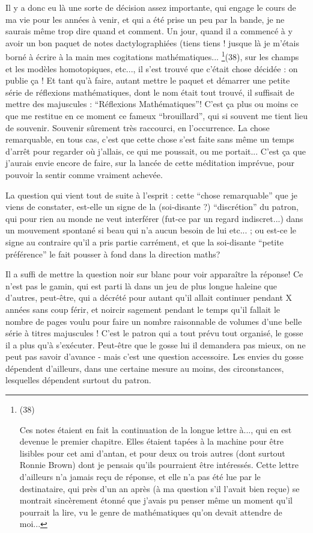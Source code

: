 Il y a donc eu là une sorte de décision assez importante, qui engage le cours de ma vie pour les années à venir, et qui a été prise un peu par la bande, je ne saurais même trop dire quand et comment. Un jour, quand il a commencé à y avoir un bon paquet de notes dactylographiées (tiens tiens ! jusque là je m'étais borné à écrire à la main mes cogitations mathématiques... \footnote{(38) \par Ces notes étaient en fait la continuation de la longue lettre à..., qui en est devenue le premier chapitre. Elles étaient tapées à la machine pour être lisibles pour cet ami d'antan, et pour deux ou trois autres (dont surtout Ronnie Brown) dont je pensais qu'ils pourraient être intéressés. Cette lettre d'ailleurs n'a jamais reçu de réponse, et elle n'a pas été lue par le destinataire, qui près d'un an après (à ma question s'il l'avait bien reçue) se montrait sincèrement étonné que j'avais pu penser même un moment qu'il pourrait la lire, vu le genre de mathématiques qu'on devait attendre de moi...}(38), sur les champs et les modèles homotopiques, etc..., il s'est trouvé que c'était chose décidée : on publie ça ! Et tant qu'à faire, autant mettre le paquet et démarrer une petite série de réflexions mathématiques, dont le nom était tout trouvé, il suffisait de mettre des majuscules : ``Réflexions Mathématiques''! C’est ça plus ou moins ce que me restitue en ce moment ce fameux ``brouillard'', qui si souvent me tient lieu de souvenir. Souvenir sûrement très raccourci, en l'occurrence. La chose remarquable, en tous cas, c'est que cette chose s'est faite sans même un temps d'arrêt pour regarder où j'allais, ce qui me poussait, ou me portait... C'est ça que j'aurais envie encore de faire, sur la lancée de cette méditation imprévue, pour pouvoir la sentir comme vraiment achevée.

La question qui vient tout de suite à l'esprit : cette ``chose remarquable'' que je viens de constater, est-elle un signe de la (soi-disante ?) ``discrétion'' du patron, qui pour rien au monde ne veut interférer (fut-ce par un regard indiscret...) dans un mouvement spontané si beau qui n'a aucun besoin de lui etc... ; ou est-ce le signe au contraire qu'il a pris partie carrément, et que la soi-disante ``petite préférence'' le fait pousser à fond dans la direction maths?

Il a suffi de mettre la question noir sur blanc pour voir apparaître la réponse! Ce n'est pas le gamin, qui est parti là dans un jeu de plus longue haleine que d'autres, peut-être, qui a décrété pour autant qu'il allait continuer pendant X années sans coup férir, et noircir sagement pendant le temps qu'il fallait le nombre de pages voulu pour faire un nombre raisonnable de volumes d'une belle série à titres majuscules ! C'est le patron qui a tout prévu tout organisé, le gosse il a plus qu'à s'exécuter. Peut-être que le gosse lui il demandera pas mieux, on ne peut pas savoir d'avance - mais c'est une question accessoire. Les envies du gosse dépendent d'ailleurs, dans une certaine mesure au moins, des circonstances, lesquelles dépendent surtout du patron.

